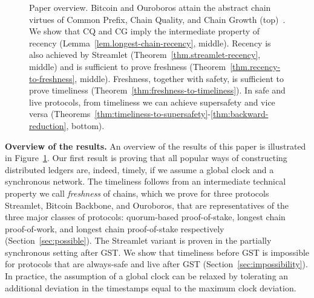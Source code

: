 \begin{figure}
  \caption{Paper overview. Bitcoin and Ouroboros attain the abstract chain virtues
  of Common Prefix, Chain Quality, and Chain Growth (top)~\cite{backbone,ouroboros}.
  We show that CQ and CG imply the intermediate property of recency (Lemma~\ref{lem.longest-chain-recency}, middle).
  Recency is also achieved by Streamlet (Theorem~\ref{thm.streamlet-recency}, middle) and is sufficient
  to prove freshness (Theorem~\ref{thm.recency-to-freshness}, middle).
  Freshness, together with safety, is sufficient to prove timeliness
  (Theorem~\ref{thm:freshness-to-timeliness}). In safe and live protocols, from timeliness we can achieve supersafety
  and vice versa (Theorems~\ref{thm:timeliness-to-supersafety}-\ref{thm:backward-reduction}, bottom).
  }
 \label{fig:overview}
\end{figure}

\noindent
\textbf{Overview of the results.}
An overview of the results of this paper is illustrated in Figure~\ref{fig:overview}.
Our first result is proving that all popular ways of constructing distributed ledgers
are, indeed, timely, if we assume a global clock and a synchronous network.
The timeliness follows from an intermediate technical property we call \emph{freshness}
of chains, which we prove for three protocols
Streamlet, Bitcoin Backbone, and Ouroboros, that are representatives
of the three major classes of protocols: quorum-based proof-of-stake, longest chain
proof-of-work, and longest chain proof-of-stake respectively (Section~\ref{sec:possible}).
The Streamlet variant is proven in the partially synchronous setting after GST.
We show that timeliness before GST is impossible for protocols that are always-safe
and live after GST (Section~\ref{sec:impossibility}).
In practice, the assumption of a global clock can be relaxed by tolerating an additional deviation in the timestamps equal to the maximum clock deviation.

